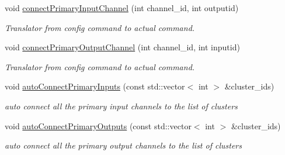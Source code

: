 \begin{DoxyCompactItemize}
void \hyperlink{classcryomesh_1_1manager_1_1Creator_a074c92de2d06664b5d9d9fa5f96aa5ee}{connect\-Primary\-Input\-Channel} (int channel\-\_\-id, int outputid)
\begin{DoxyCompactList}\small\item\em \-Translator from config command to actual command. \end{DoxyCompactList}\item 
void \hyperlink{classcryomesh_1_1manager_1_1Creator_a0977991d6697d06a104aacf40c07f5b4}{connect\-Primary\-Output\-Channel} (int channel\-\_\-id, int inputid)
\begin{DoxyCompactList}\small\item\em \-Translator from config command to actual command. \end{DoxyCompactList}\item 
void \hyperlink{classcryomesh_1_1manager_1_1Creator_a8c773b097b7b4db87a46f749a2606a2b}{auto\-Connect\-Primary\-Inputs} (const std\-::vector$<$ int $>$ \&cluster\-\_\-ids)
\begin{DoxyCompactList}\small\item\em auto connect all the primary input channels to the list of clusters \end{DoxyCompactList}\item 
void \hyperlink{classcryomesh_1_1manager_1_1Creator_a7ad46f5b3864cc596f0f36b55f884ce7}{auto\-Connect\-Primary\-Outputs} (const std\-::vector$<$ int $>$ \&cluster\-\_\-ids)
\begin{DoxyCompactList}\small\item\em auto connect all the primary output channels to the list of clusters \end{DoxyCompactList}\end{DoxyCompactItemize}
